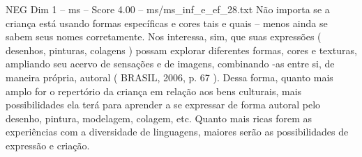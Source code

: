 \begin{textsample}{NEG Dim 1 – ms – Score 4.00 – ms/ms\_inf\_e\_ef\_28.txt}
Não importa se a criança está usando formas específicas e cores tais e quais – menos ainda se sabem seus nomes corretamente.
Nos interessa, sim, que suas expressões ( desenhos, pinturas, colagens ) possam explorar diferentes formas, cores e texturas, ampliando seu acervo de sensações e de imagens, combinando -as entre si, de maneira própria, autoral ( BRASIL, 2006, p. 67 ).
Dessa forma, quanto mais amplo for o repertório da criança em relação aos bens culturais, mais possibilidades ela terá para aprender a se expressar de forma autoral pelo desenho, pintura, modelagem, colagem, etc.
Quanto mais ricas forem as experiências com a diversidade de linguagens, maiores serão as possibilidades de expressão e criação.

\end{textsample}
